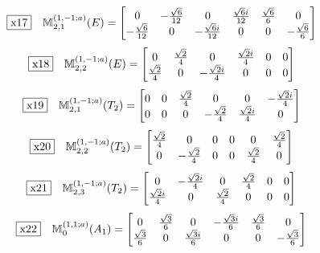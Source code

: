 \documentclass[fleqn,10pt,landscape]{jsarticle}
\begin{document}
\begin{dmath*}
\fbox{x17}\quad \mathbb{M}_{2,1}^{(1,-1;a)}(E)=\begin{bmatrix} 0 & - \frac{\sqrt{6}}{12} & 0 & \frac{\sqrt{6} i}{12} & \frac{\sqrt{6}}{6} & 0 \\ - \frac{\sqrt{6}}{12} & 0 & - \frac{\sqrt{6} i}{12} & 0 & 0 & - \frac{\sqrt{6}}{6} \end{bmatrix}
\end{dmath*}
\begin{dmath*}
\fbox{x18}\quad \mathbb{M}_{2,2}^{(1,-1;a)}(E)=\begin{bmatrix} 0 & \frac{\sqrt{2}}{4} & 0 & \frac{\sqrt{2} i}{4} & 0 & 0 \\ \frac{\sqrt{2}}{4} & 0 & - \frac{\sqrt{2} i}{4} & 0 & 0 & 0 \end{bmatrix}
\end{dmath*}
\begin{dmath*}
\fbox{x19}\quad \mathbb{M}_{2,1}^{(1,-1;a)}(T_{2})=\begin{bmatrix} 0 & 0 & \frac{\sqrt{2}}{4} & 0 & 0 & - \frac{\sqrt{2} i}{4} \\ 0 & 0 & 0 & - \frac{\sqrt{2}}{4} & \frac{\sqrt{2} i}{4} & 0 \end{bmatrix}
\end{dmath*}
\begin{dmath*}
\fbox{x20}\quad \mathbb{M}_{2,2}^{(1,-1;a)}(T_{2})=\begin{bmatrix} \frac{\sqrt{2}}{4} & 0 & 0 & 0 & 0 & \frac{\sqrt{2}}{4} \\ 0 & - \frac{\sqrt{2}}{4} & 0 & 0 & \frac{\sqrt{2}}{4} & 0 \end{bmatrix}
\end{dmath*}
\begin{dmath*}
\fbox{x21}\quad \mathbb{M}_{2,3}^{(1,-1;a)}(T_{2})=\begin{bmatrix} 0 & - \frac{\sqrt{2} i}{4} & 0 & \frac{\sqrt{2}}{4} & 0 & 0 \\ \frac{\sqrt{2} i}{4} & 0 & \frac{\sqrt{2}}{4} & 0 & 0 & 0 \end{bmatrix}
\end{dmath*}
\begin{dmath*}
\fbox{x22}\quad \mathbb{M}_{0}^{(1,1;a)}(A_{1})=\begin{bmatrix} 0 & \frac{\sqrt{3}}{6} & 0 & - \frac{\sqrt{3} i}{6} & \frac{\sqrt{3}}{6} & 0 \\ \frac{\sqrt{3}}{6} & 0 & \frac{\sqrt{3} i}{6} & 0 & 0 & - \frac{\sqrt{3}}{6} \end{bmatrix}
\end{dmath*}
\end{document}
